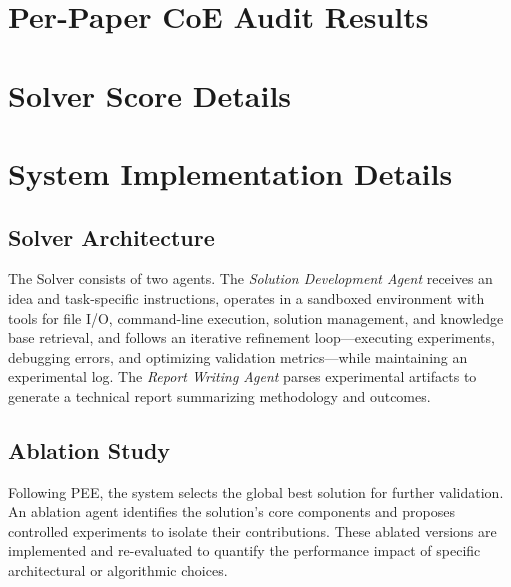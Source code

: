 \section{Per-Paper CoE Audit Results}
\label{app:per_paper}




\section{Solver Score Details}
\label{app:solver_details}



\section{System Implementation Details}
\label{app:system_details}

\subsection{Solver Architecture}

The Solver consists of two agents.
The \emph{Solution Development Agent} receives an idea and task-specific instructions, operates in a sandboxed environment with tools for file I/O, command-line execution, solution management, and knowledge base retrieval, and follows an iterative refinement loop---executing experiments, debugging errors, and optimizing validation metrics---while maintaining an experimental log.
The \emph{Report Writing Agent} parses experimental artifacts to generate a technical report summarizing methodology and outcomes.

\subsection{Ablation Study}

Following PEE, the system selects the global best solution for further validation.
An ablation agent identifies the solution's core components and proposes controlled experiments to isolate their contributions.
These ablated versions are implemented and re-evaluated to quantify the performance impact of specific architectural or algorithmic choices.

